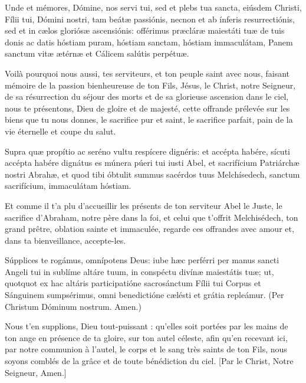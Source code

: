 \documentclass[twoside]{article}
\begin{document}
\begin{paracol}{2}

Unde et mémores, Dómine,
nos servi tui,
sed et plebs tua sancta,
eiúsdem Christi, Fílii tui, Dómini nostri,
tam beátæ passiónis,
necnon et ab ínferis resurrectiónis,
sed et in cælos gloriósæ ascensiónis:
offérimus præcláræ maiestáti tuæ
de tuis donis ac datis
hóstiam puram,
hóstiam sanctam,
hóstiam immaculátam,
Panem sanctum vitæ ætérnæ
et Cálicem salútis perpétuæ.

\switchcolumn

Voilà pourquoi nous aussi, tes serviteurs, et ton peuple saint avec nous, faisant mémoire de la passion bienheureuse de ton Fils, Jésus, le Christ, notre Seigneur, de sa résurrection du séjour des morts et de sa glorieuse ascension dans le ciel, nous te présentons, Dieu de gloire et de majesté, cette offrande prélevée sur les biens que tu nous donnes, le sacrifice pur et saint, le sacrifice parfait, pain de la vie éternelle et coupe du salut.

\switchcolumn*

Supra quæ propítio ac seréno vultu
respícere dignéris:
et accépta habére,
sícuti accépta habére dignátus es
múnera púeri tui iusti Abel,
et sacrifícium Patriárchæ nostri Abrahæ,
et quod tibi óbtulit summus sacérdos tuus Melchísedech,
sanctum sacrifícium, immaculátam hóstiam.

\switchcolumn

Et comme il t'a plu d'accueillir les présents de ton serviteur Abel le Juste, le sacrifice d’Abraham, notre père dans la foi, et celui que t'offrit Melchisédech, ton grand prêtre, oblation sainte et immaculée, regarde ces offrandes avec amour et, dans ta bienveillance, accepte-les.

\switchcolumn*

Súpplices te rogámus, omnípotens Deus:
iube hæc perférri per manus sancti Angeli tui
in sublíme altáre tuum,
in conspéctu divínæ maiestátis tuæ;
ut, quotquot ex hac altáris participatióne
sacrosánctum Fílii tui Corpus et Sánguinem
sumpsérimus,
omni benedictióne cælésti et grátia repleámur.
(Per Christum Dóminum nostrum. Amen.)

\switchcolumn

Nous t'en supplions, Dieu tout-puissant : qu'elles soit portées par les mains de ton ange en présence de ta gloire, sur ton autel céleste, afin qu'en recevant ici, par notre communion à l'autel, le corps et le sang très saints de ton Fils, 
nous soyons comblés de la grâce et de toute bénédiction du ciel. [Par le Christ, Notre Seigneur, Amen.]


\end{paracol}
\end{document}
